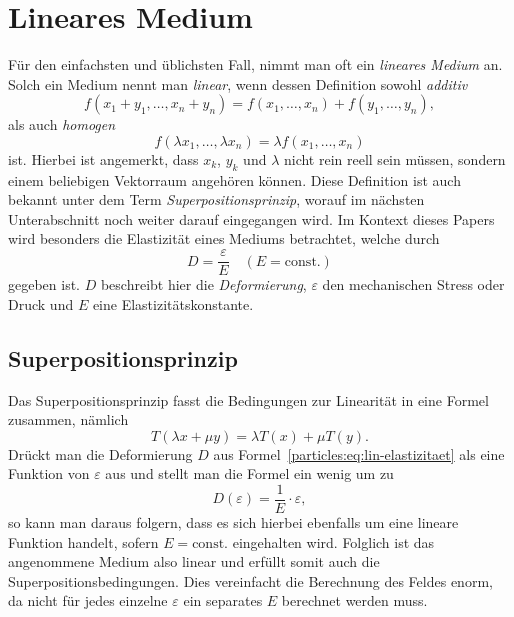%
%
%
%
\section{Lineares Medium\label{particles:section:linear}}
Für den einfachsten und üblichsten Fall, nimmt man oft ein \emph{lineares Medium} an.
Solch ein Medium nennt man \emph{linear}, wenn dessen Definition sowohl \emph{additiv}
\[
    f(x_{1} + y_{1}, \ldots, x_{n} + y_{n}) 
    = f(x_{1}, \ldots, x_{n}) + f(y_{1}, \ldots, y_{n}),
\]
als auch \emph{homogen}
\[
    f(\lambda x_{1}, \ldots, \lambda x_{n}) 
    = \lambda f(x_{1}, \ldots, x_{n})
\]
ist.
Hierbei ist angemerkt, dass $x_{k}$, $y_{k}$ und $\lambda$ nicht rein reell sein müssen, 
sondern einem beliebigen Vektorraum angehören können. %
Diese Definition ist auch bekannt unter dem Term \emph{Superpositionsprinzip}, 
worauf im nächsten Unterabschnitt noch weiter darauf eingegangen wird. %
Im Kontext dieses Papers wird besonders die Elastizität eines Mediums betrachtet, 
welche durch
\[
    D
    = \frac{\varepsilon}{E}
    \quad
    (E = \text{const.})\label{particles:eq:lin-elastizitaet}
\]
gegeben ist. 
$D$ beschreibt hier die \emph{Deformierung}, %
$\varepsilon$ den mechanischen Stress oder Druck und
$E$ eine Elastizitätskonstante.


\subsection{Superpositionsprinzip}
Das Superpositionsprinzip fasst die Bedingungen zur Linearität in eine Formel zusammen, nämlich
\[
    T(\lambda x + \mu y)
    = \lambda T(x) + \mu T(y).
\]
Drückt man die Deformierung $D$ aus Formel~\ref{particles:eq:lin-elastizitaet} als eine Funktion von $\varepsilon$ aus
und stellt man die Formel ein wenig um zu 
\[
    D(\varepsilon)
    = \frac{1}{E} \cdot \varepsilon,
\]
so kann man daraus folgern, dass es sich hierbei ebenfalls um eine lineare Funktion handelt, 
sofern $E = \text{const.}$ eingehalten wird.
Folglich ist das angenommene Medium also linear und erfüllt somit auch die Superpositionsbedingungen.
Dies vereinfacht die Berechnung des Feldes enorm, 
da nicht für jedes einzelne $\varepsilon$ ein separates $E$ berechnet werden muss. 

